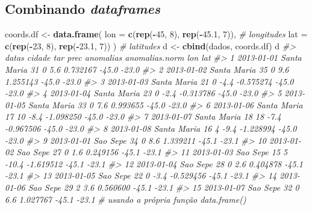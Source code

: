 \documentclass[]{book}
\newenvironment{Shaded}{\begin{snugshade}}{\end{snugshade}}
\newcommand{\KeywordTok}[1]{\textcolor[rgb]{0.13,0.29,0.53}{\textbf{#1}}}
\newcommand{\DataTypeTok}[1]{\textcolor[rgb]{0.13,0.29,0.53}{#1}}
\newcommand{\DecValTok}[1]{\textcolor[rgb]{0.00,0.00,0.81}{#1}}
\newcommand{\FloatTok}[1]{\textcolor[rgb]{0.00,0.00,0.81}{#1}}
\newcommand{\StringTok}[1]{\textcolor[rgb]{0.31,0.60,0.02}{#1}}
\newcommand{\CommentTok}[1]{\textcolor[rgb]{0.56,0.35,0.01}{\textit{#1}}}
\newcommand{\OperatorTok}[1]{\textcolor[rgb]{0.81,0.36,0.00}{\textbf{#1}}}
\newcommand{\NormalTok}[1]{#1}
\begin{document}
\subsection{\texorpdfstring{Combinando
\emph{dataframes}}{Combinando dataframes}}\label{combinando-dataframes}

\begin{Shaded}
\begin{Highlighting}[]
\NormalTok{coords.df <-}\StringTok{ }\KeywordTok{data.frame}\NormalTok{(}
  \DataTypeTok{lon =} \KeywordTok{c}\NormalTok{(}\KeywordTok{rep}\NormalTok{(}\OperatorTok{-}\DecValTok{45}\NormalTok{, }\DecValTok{8}\NormalTok{), }\KeywordTok{rep}\NormalTok{(}\OperatorTok{-}\FloatTok{45.1}\NormalTok{, }\DecValTok{7}\NormalTok{)), }\CommentTok{# longitudes}
  \DataTypeTok{lat =} \KeywordTok{c}\NormalTok{(}\KeywordTok{rep}\NormalTok{(}\OperatorTok{-}\DecValTok{23}\NormalTok{, }\DecValTok{8}\NormalTok{), }\KeywordTok{rep}\NormalTok{(}\OperatorTok{-}\FloatTok{23.1}\NormalTok{, }\DecValTok{7}\NormalTok{))}
\NormalTok{) }\CommentTok{# latitudes}
\NormalTok{d <-}\StringTok{ }\KeywordTok{cbind}\NormalTok{(dados, coords.df)}
\NormalTok{d}
\CommentTok{#>         datas      cidade tar prec anomalias anomalias.norm   lon   lat}
\CommentTok{#> 1  2013-01-01 Santa Maria  31    0       5.6       0.732167 -45.0 -23.0}
\CommentTok{#> 2  2013-01-02 Santa Maria  35    0       9.6       1.255143 -45.0 -23.0}
\CommentTok{#> 3  2013-01-03 Santa Maria  21    0      -4.4      -0.575274 -45.0 -23.0}
\CommentTok{#> 4  2013-01-04 Santa Maria  23    0      -2.4      -0.313786 -45.0 -23.0}
\CommentTok{#> 5  2013-01-05 Santa Maria  33    0       7.6       0.993655 -45.0 -23.0}
\CommentTok{#> 6  2013-01-06 Santa Maria  17   10      -8.4      -1.098250 -45.0 -23.0}
\CommentTok{#> 7  2013-01-07 Santa Maria  18   18      -7.4      -0.967506 -45.0 -23.0}
\CommentTok{#> 8  2013-01-08 Santa Maria  16    4      -9.4      -1.228994 -45.0 -23.0}
\CommentTok{#> 9  2013-01-01    Sao Sepe  34    0       8.6       1.339211 -45.1 -23.1}
\CommentTok{#> 10 2013-01-02    Sao Sepe  27    0       1.6       0.249156 -45.1 -23.1}
\CommentTok{#> 11 2013-01-03    Sao Sepe  15    5     -10.4      -1.619512 -45.1 -23.1}
\CommentTok{#> 12 2013-01-04    Sao Sepe  28    0       2.6       0.404878 -45.1 -23.1}
\CommentTok{#> 13 2013-01-05    Sao Sepe  22    0      -3.4      -0.529456 -45.1 -23.1}
\CommentTok{#> 14 2013-01-06    Sao Sepe  29    2       3.6       0.560600 -45.1 -23.1}
\CommentTok{#> 15 2013-01-07    Sao Sepe  32    0       6.6       1.027767 -45.1 -23.1}
\CommentTok{# usando a própria função data.frame()}

\end{Highlighting}
\end{Shaded}
\end{document}
